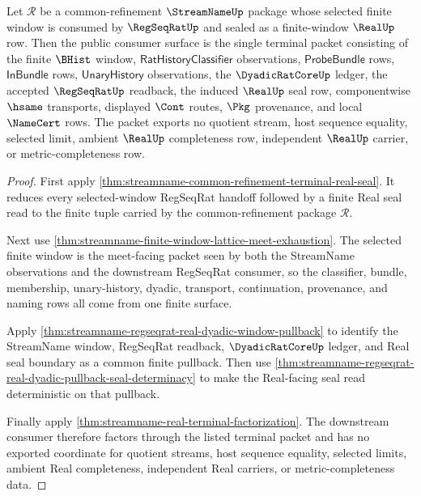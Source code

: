\begin{theorem}
\label{thm:streamname-real-regseq-terminal-common-window-lock}
Let $\mathcal R$ be a common-refinement $\StreamNameUp$ package whose selected finite window is consumed by $\RegSeqRatUp$ and sealed as a finite-window $\RealUp$ row. Then the public consumer surface is the single terminal packet consisting of the finite $\BHist$ window, $\mathsf{RatHistoryClassifier}$ observations, $\mathsf{ProbeBundle}$ rows, $\mathsf{InBundle}$ rows, $\mathsf{UnaryHistory}$ observations, the $\DyadicRatCoreUp$ ledger, the accepted $\RegSeqRatUp$ readback, the induced $\RealUp$ seal row, componentwise $\hsame$ transports, displayed $\Cont$ routes, $\Pkg$ provenance, and local $\NameCert$ rows. The packet exports no quotient stream, host sequence equality, selected limit, ambient $\RealUp$ completeness row, independent $\RealUp$ carrier, or metric-completeness row.
\end{theorem}
\begin{proof}
First apply \autoref{thm:streamname-common-refinement-terminal-real-seal}. It reduces every selected-window RegSeqRat handoff followed by a finite Real seal read to the finite tuple carried by the common-refinement package $\mathcal R$.

Next use \autoref{thm:streamname-finite-window-lattice-meet-exhaustion}. The selected finite window is the meet-facing packet seen by both the StreamName observations and the downstream RegSeqRat consumer, so the classifier, bundle, membership, unary-history, dyadic, transport, continuation, provenance, and naming rows all come from one finite surface.

Apply \autoref{thm:streamname-regseqrat-real-dyadic-window-pullback} to identify the StreamName window, RegSeqRat readback, $\DyadicRatCoreUp$ ledger, and Real seal boundary as a common finite pullback. Then use \autoref{thm:streamname-regseqrat-real-dyadic-pullback-seal-determinacy} to make the Real-facing seal read deterministic on that pullback.

Finally apply \autoref{thm:streamname-real-terminal-factorization}. The downstream consumer therefore factors through the listed terminal packet and has no exported coordinate for quotient streams, host sequence equality, selected limits, ambient Real completeness, independent Real carriers, or metric-completeness data.
\end{proof}

